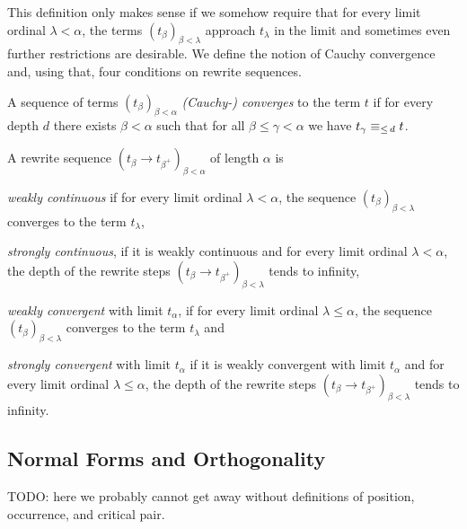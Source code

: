 This definition only makes sense if we somehow require that for every limit
ordinal $\lambda < \alpha$, the terms $(t_\beta)_{\beta < \lambda}$ approach
$t_\lambda$ in the limit and sometimes even further restrictions are
desirable. We define the notion of Cauchy convergence and, using that, four
conditions on rewrite sequences.

\begin{definition}\label{def:cauchy}%
  A sequence of terms $(t_\beta)_{\beta < \alpha}$ \emph{(Cauchy-) converges}
  to the term $t$ if for every depth $d$ there exists $\beta < \alpha$ such
  that for all $\beta \le \gamma < \alpha$ we have $t_\gamma \equiv_{\le \, d} t$.
\end{definition}

\begin{definition}%
A rewrite sequence $(t_\beta \rightarrow t_{\beta^+})_{\beta < \alpha}$ of
length $\alpha$ is
\begin{compactenum}
  \item
    \emph{weakly continuous} if for every limit ordinal $\lambda < \alpha$,
    the sequence $(t_\beta)_{\beta < \lambda}$ converges to the term
    $t_\lambda$,
  \item
    \emph{strongly continuous}, if it is weakly continuous and for every limit
    ordinal $\lambda < \alpha$, the depth of the rewrite steps $(t_\beta
    \rightarrow t_{\beta^+})_{\beta < \lambda}$ tends to infinity,
  \item
    \emph{weakly convergent} with limit $t_\alpha$, if for every limit ordinal
    $\lambda \leq \alpha$, the sequence $(t_\beta)_{\beta < \lambda}$
    converges to the term $t_\lambda$ and
  \item
    \emph{strongly convergent} with limit $t_\alpha$ if it is weakly
    convergent with limit $t_\alpha$ and for every limit ordinal $\lambda \leq
    \alpha$, the depth of the rewrite steps $(t_\beta \rightarrow
    t_{\beta^+})_{\beta < \lambda}$ tends to infinity.
\end{compactenum}
\end{definition}


\subsection{Normal Forms and Orthogonality}

TODO: here we probably cannot get away without definitions of position,
occurrence, and critical pair.

